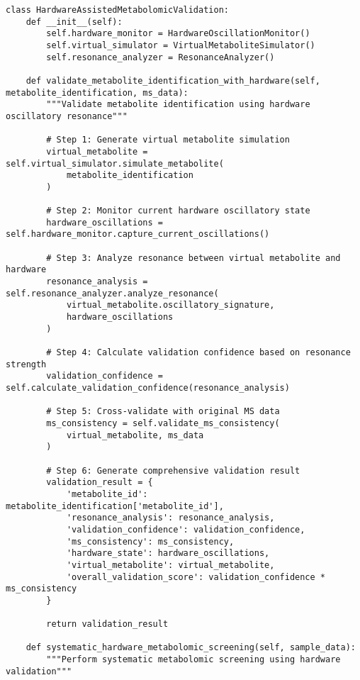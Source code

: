 \documentclass[12pt,a4paper]{article}
\begin{document}
\begin{lstlisting}[style=pythonstyle, caption=Hardware-Assisted Metabolomic Validation]
class HardwareAssistedMetabolomicValidation:
    def __init__(self):
        self.hardware_monitor = HardwareOscillationMonitor()
        self.virtual_simulator = VirtualMetaboliteSimulator()
        self.resonance_analyzer = ResonanceAnalyzer()
    
    def validate_metabolite_identification_with_hardware(self, metabolite_identification, ms_data):
        """Validate metabolite identification using hardware oscillatory resonance"""
        
        # Step 1: Generate virtual metabolite simulation
        virtual_metabolite = self.virtual_simulator.simulate_metabolite(
            metabolite_identification
        )
        
        # Step 2: Monitor current hardware oscillatory state
        hardware_oscillations = self.hardware_monitor.capture_current_oscillations()
        
        # Step 3: Analyze resonance between virtual metabolite and hardware
        resonance_analysis = self.resonance_analyzer.analyze_resonance(
            virtual_metabolite.oscillatory_signature,
            hardware_oscillations
        )
        
        # Step 4: Calculate validation confidence based on resonance strength
        validation_confidence = self.calculate_validation_confidence(resonance_analysis)
        
        # Step 5: Cross-validate with original MS data
        ms_consistency = self.validate_ms_consistency(
            virtual_metabolite, ms_data
        )
        
        # Step 6: Generate comprehensive validation result
        validation_result = {
            'metabolite_id': metabolite_identification['metabolite_id'],
            'resonance_analysis': resonance_analysis,
            'validation_confidence': validation_confidence,
            'ms_consistency': ms_consistency,
            'hardware_state': hardware_oscillations,
            'virtual_metabolite': virtual_metabolite,
            'overall_validation_score': validation_confidence * ms_consistency
        }
        
        return validation_result
    
    def systematic_hardware_metabolomic_screening(self, sample_data):
        """Perform systematic metabolomic screening using hardware validation"""
        

\end{lstlisting}
\end{document}
